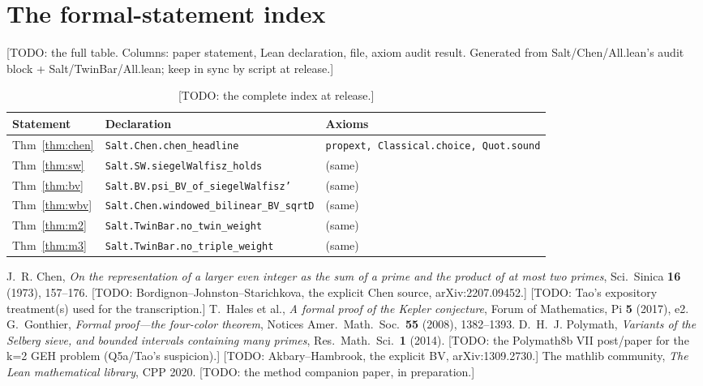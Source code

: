 \documentclass[11pt]{amsart}
\newcommand{\leaninline}[1]{{\small\texttt{#1}}}
\theoremstyle{remark}
\begin{document}
\appendix
\section{The formal-statement index}\label{app:index}

[TODO: the full table. Columns: paper statement, Lean declaration, file,
axiom audit result. Generated from Salt/Chen/All.lean's audit block +
Salt/TwinBar/All.lean; keep in sync by script at release.]

\begin{table}[h]
\centering\small
\begin{tabular}{lll}
\toprule
Statement & Declaration & Axioms \\
\midrule
Thm~\ref{thm:chen} & \leaninline{Salt.Chen.chen\_headline} &
  \leaninline{propext, Classical.choice, Quot.sound} \\
Thm~\ref{thm:sw} & \leaninline{Salt.SW.siegelWalfisz\_holds} & (same) \\
Thm~\ref{thm:bv} & \leaninline{Salt.BV.psi\_BV\_of\_siegelWalfisz'} & (same) \\
Thm~\ref{thm:wbv} & \leaninline{Salt.Chen.windowed\_bilinear\_BV\_sqrtD} & (same) \\
Thm~\ref{thm:m2} & \leaninline{Salt.TwinBar.no\_twin\_weight} & (same) \\
Thm~\ref{thm:m3} & \leaninline{Salt.TwinBar.no\_triple\_weight} & (same) \\
\bottomrule
\end{tabular}
\caption{[TODO: the complete index at release.]}
\end{table}

\begin{thebibliography}{99}
 J.~R. Chen, \emph{On the representation of a larger even
integer as the sum of a prime and the product of at most two primes},
Sci.\ Sinica \textbf{16} (1973), 157--176.
 [TODO: Bordignon--Johnston--Starichkova, the explicit Chen
source, arXiv:2207.09452.]
 [TODO: Tao's expository treatment(s) used for the
transcription.]
 T.~Hales et al., \emph{A formal proof of the Kepler
conjecture}, Forum of Mathematics, Pi \textbf{5} (2017), e2.
 G.~Gonthier, \emph{Formal proof---the four-color
theorem}, Notices Amer.\ Math.\ Soc.\ \textbf{55} (2008), 1382--1393.
 D.~H.~J. Polymath, \emph{Variants of the Selberg
sieve, and bounded intervals containing many primes}, Res.\ Math.\ Sci.\
\textbf{1} (2014).
 [TODO: the Polymath8b VII post/paper for the k=2
GEH problem (Q5a/Tao's suspicion).]
 [TODO: Akbary--Hambrook, the explicit BV,
arXiv:1309.2730.]
 The mathlib community, \emph{The Lean mathematical
library}, CPP 2020.
 [TODO: the method companion paper, in preparation.]
\end{thebibliography}
\end{document}
